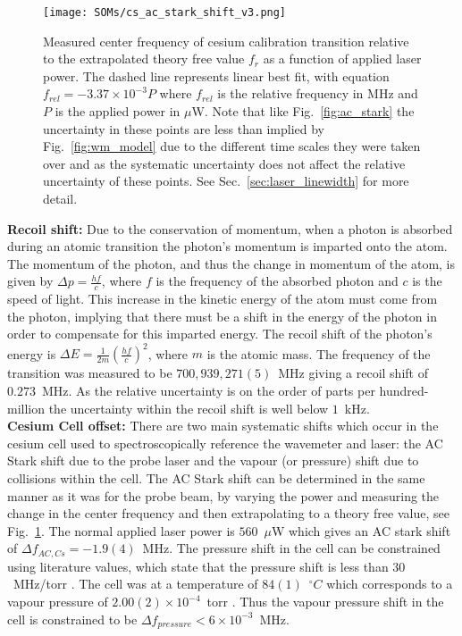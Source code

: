 \documentclass[%
 amsmath,amssymb,
aps,
]{revtex4-2}
\begin{document}
\begin{figure}[b]
    \centering
    \texttt{[image: SOMs/cs\_ac\_stark\_shift\_v3.png]}
    \caption{Measured center frequency of cesium calibration transition relative to the extrapolated theory free value \(f_r\) as a function of applied laser power. The dashed line represents linear best fit, with equation \(f_{rel} = -3.37\times 10^{-3} P\) where \(f_{rel}\) is the relative frequency in MHz and \(P\) is the applied power in \(\mu\)W. Note that like Fig.~\ref{fig:ac_stark} the uncertainty in these points are less than implied by Fig.~\ref{fig:wm_model} due to the different time scales they were taken over and as the systematic uncertainty does not affect the relative uncertainty of these points. See Sec.~\ref{sec:laser_linewidth} for more detail.}
    \label{fig:cs_stark_shift}
\end{figure}

         
         \textbf{Recoil shift:}
         Due to the conservation of momentum, when a photon is absorbed during an atomic transition the photon's momentum is imparted onto the atom. The momentum of the photon, and thus the change in momentum of the atom, is given by \(\Delta p = \frac{hf}{c}\), where \(f\) is the frequency of the absorbed photon and \(c\) is the speed of light. This increase in the kinetic energy of the atom must come from the photon, implying that there must be a shift in the energy of the photon in order to compensate for this imparted energy. The recoil shift of the photon's energy is \(\Delta E = \frac{1}{2m} \left( \frac{hf}{c} \right)^2\), where \(m\) is the atomic mass. The frequency of the transition was measured to be \(700,939,271(5)\)~MHz giving a recoil shift of \(0.273\)~MHz. As the relative uncertainty is on the order of parts per hundred-million the uncertainty within the recoil shift is well below \(1\)~kHz.\\
         
         
         \textbf{Cesium Cell offset:}  There are two main systematic shifts which occur in the cesium cell used to spectroscopically reference the wavemeter and laser: the AC Stark shift due to the probe laser and the vapour (or pressure) shift due to collisions within the cell. The AC Stark shift can be determined in the same manner as it was for the probe beam, by varying the power and measuring the change in the center frequency and then extrapolating to a theory free value, see Fig.~\ref{fig:cs_stark_shift}. The normal applied laser power is \(560\)~\(\mu\)W which gives an AC stark shift of \(\Delta f_{AC,Cs} = -1.9(4)\)~MHz. The pressure shift in the cell can be constrained using literature values, which state that the pressure shift is less than \(30\)~MHz/torr \cite{PhysRevA.80.062718,PhysRevA.82.042502}. The cell was at a temperature of \(84(1)\)~\(^\circ C\) which corresponds to a vapour pressure of \(2.00(2)\times 10^{-4}\)~torr \cite{1964JChEd..41R.590M}. Thus the vapour pressure shift in the cell is constrained to be \(\Delta f_{pressure} < 6 \times 10^{-3}\)~MHz.
\end{document}
